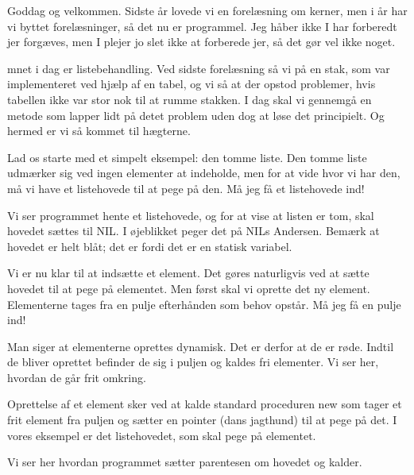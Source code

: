 \documentclass[a4paper,11pt]{article}
\begin{document}
\begin{sketch}

 Goddag og velkommen. Sidste år lovede vi en forelæsning om kerner, men
i år har vi byttet forelæsninger, så det nu er programmel. Jeg håber ikke I har
forberedt jer forgæves, men I plejer jo slet ikke at forberede jer, så det gør
vel ikke noget.

mnet i dag er listebehandling.  Ved sidste forelæsning så vi på en stak, som var
implementeret ved hjælp af en tabel, og vi så at der opstod problemer, hvis
tabellen ikke var stor nok til at rumme stakken. I dag skal vi gennemgå en
metode som lapper lidt på detet problem uden dog at løse det principielt. Og
hermed er vi så kommet til hægterne.

Lad os starte med et simpelt eksempel: den tomme liste. Den tomme liste udmærker
sig ved ingen elementer at indeholde, men for at vide hvor vi har den, må vi
have et listehovede til at pege på den. Må jeg få et listehovede ind!



 Vi ser programmet hente et listehovede, og for at vise at listen er
tom, skal hovedet sættes til NIL. I øjeblikket peger det på NILs Andersen.
Bemærk at hovedet er helt blåt; det er fordi det er en statisk variabel.


 Vi er nu klar til at indsætte et element. Det gøres naturligvis ved at
sætte hovedet til at pege på elementet. Men først skal vi oprette det ny
element. Elementerne tages fra en pulje efterhånden som behov opstår. Må jeg få
en pulje ind!


 Man siger at elementerne oprettes dynamisk. Det er derfor at de er
røde. Indtil de bliver oprettet befinder de sig i puljen og kaldes fri
elementer. Vi ser her, hvordan de går frit omkring.

Oprettelse af et element sker ved at kalde standard proceduren new som tager et
frit element fra puljen og sætter en pointer (dans jagthund) til at pege på
det. I vores eksempel er det listehovedet, som skal pege på elementet.

Vi ser her hvordan programmet sætter parentesen om hovedet og kalder.


\end{sketch}
\end{document}
